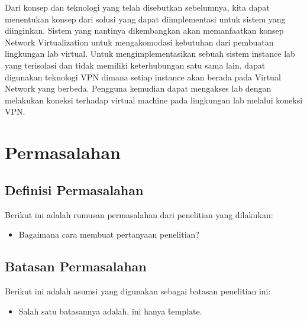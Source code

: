 Dari konsep dan teknologi yang telah disebutkan sebelumnya, kita dapat menentukan konsep dari solusi yang dapat diimplementasi untuk sistem yang diinginkan.
Sistem yang nantinya dikembangkan akan memanfaatkan konsep Network Virtualization untuk mengakomodasi kebutuhan dari pembuatan lingkungan lab virtual.
Untuk mengimplementasikan sebuah sistem instance lab yang terisolasi dan tidak memiliki keterhubungan satu sama lain, 
dapat digunakan teknologi VPN dimana setiap instance akan berada pada Virtual Network yang berbeda.
Pengguna kemudian dapat mengakses lab dengan melakukan koneksi terhadap virtual machine pada lingkungan lab melalui koneksi VPN.
\par


\section{Permasalahan}
\label{sec:masalah}
\noindent{}

\subsection{Definisi Permasalahan}
\label{sec:definisiMasalah}
Berikut ini adalah rumusan permasalahan dari penelitian yang dilakukan:
\begin{itemize}
	\item Bagaimana cara membuat pertanyaan penelitian?
\end{itemize}
\noindent{}

\subsection{Batasan Permasalahan}
\label{sec:batasanMasalah}
Berikut ini adalah asumsi yang digunakan sebagai batasan penelitian ini:
\begin{itemize}
	\item Salah satu batasannya adalah, ini hanya \f{template}.
\end{itemize}

